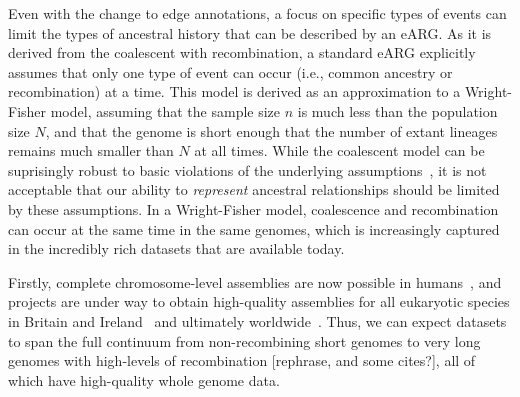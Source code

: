 \documentclass{article}
\begin{document}
Even with the change to edge annotations, a focus on specific
types of events can limit the types of ancestral history that can
be described by an eARG. As it is derived from the coalescent
with recombination, a standard eARG explicitly assumes that only one type
of event can occur (i.e., common ancestry or recombination) at a
time. This model is derived as an approximation to a Wright-Fisher
model, assuming that the sample size $n$ is much less than the
population size $N$, and that the genome is short enough
that the number of extant lineages remains
much smaller than $N$ at all times.
While the coalescent model can be suprisingly robust to
basic violations of the underlying assumptions~\citep{
wakeley2012gene,bhaskar2014distortion,nelson2020accounting},
it is not acceptable that our ability to \emph{represent}
ancestral relationships should be limited by these assumptions.
In a Wright-Fisher model, coalescence and recombination can
occur at the same time in the same genomes, which is increasingly
captured in the incredibly rich datasets that are available today.

Firstly, complete chromosome-level assemblies are now possible
in humans~\citep{miga2020telomere},
and projects are under way to obtain high-quality assemblies
for all eukaryotic species in Britain and Ireland~\citep{darwin2022sequence}
and ultimately worldwide~\citep{lewin2022earth}. Thus, we can
expect datasets to span the full continuum from non-recombining
short genomes to very long genomes with high-levels of recombination
[rephrase, and some cites?],
all of which have high-quality whole genome data.
\end{document}
